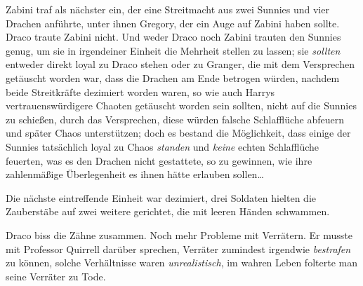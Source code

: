 Zabini traf als nächster ein, der eine Streitmacht aus zwei Sunnies und vier Drachen anführte, unter ihnen Gregory, der ein Auge auf Zabini haben sollte. Draco traute Zabini nicht. Und weder Draco noch Zabini trauten den Sunnies genug, um sie in irgendeiner Einheit die Mehrheit stellen zu lassen; sie \emph{sollten} entweder direkt loyal zu Draco stehen oder zu Granger, die mit dem Versprechen getäuscht worden war, dass die Drachen am Ende betrogen würden, nachdem beide Streitkräfte dezimiert worden waren, so wie auch Harrys vertrauenswürdigere Chaoten getäuscht worden sein sollten, nicht auf die Sunnies zu schießen, durch das Versprechen, diese würden falsche Schlafflüche abfeuern und später Chaos unterstützen; doch es bestand die Möglichkeit, dass einige der Sunnies tatsächlich loyal zu Chaos \emph{standen} und \emph{keine} echten Schlafflüche feuerten, was es den Drachen nicht gestattete, so zu gewinnen, wie ihre zahlenmäßige Überlegenheit es ihnen hätte erlauben sollen…

Die nächste eintreffende Einheit war dezimiert, drei Soldaten hielten die Zauberstäbe auf zwei weitere gerichtet, die mit leeren Händen schwammen.

Draco biss die Zähne zusammen. Noch mehr Probleme mit Verrätern. Er musste mit Professor Quirrell darüber sprechen, Verräter zumindest irgendwie \emph{bestrafen} zu können, solche Verhältnisse waren \emph{unrealistisch}, im wahren Leben folterte man seine Verräter zu Tode.

